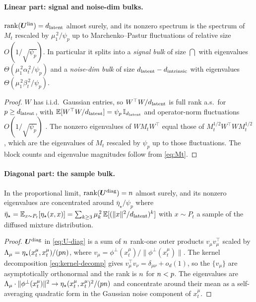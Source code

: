 \paragraph{Linear part: signal and noise-dim bulks.}
\begin{lemma}
\label{lem:Ulin}
$\mathrm{rank}(\bm{U}^{\mathrm{lin}}) = d_{\mathrm{latent}}$ almost surely, and its
nonzero spectrum is the spectrum of $M_t$ rescaled by
$\mu_1^{\,2}/\psi_p$ up to Marchenko--Pastur fluctuations of
relative size $O(1/\sqrt{\psi_p})$. In particular it splits into
a \emph{signal bulk} of size $\dint$ with eigenvalues
$\Theta(\mu_1^{\,2}\alpha_t^{\,2}/\psi_p)$ and a \emph{noise-dim bulk}
of size $d_{\mathrm{latent}} - d_{\mathrm{intrinsic}}$ with eigenvalues
$\Theta(\mu_1^{\,2}\beta_t^{\,2}/\psi_p)$.
\end{lemma}
\begin{proof}
$W$ has i.i.d.\ Gaussian entries, so $W^\top W/d_{\mathrm{latent}}$ is full rank a.s.\
for $p\ge d_{\mathrm{latent}}$, with $\mathbb{E}[W^\top W/d_{\mathrm{latent}}] = \psi_p\,\mathbb{I}_{d_{\mathrm{latent}}}$
and operator-norm fluctuations $O(1/\sqrt{\psi_p})$
\citep{pennington2017nonlinear}. The nonzero eigenvalues of
$WM_tW^\top$ equal those of $M_t^{1/2}W^\top W M_t^{1/2}$, which are
the eigenvalues of $M_t$ rescaled by $\psi_p$ up to those fluctuations.
The block counts and eigenvalue magnitudes follow from \eqref{eq:Mt}.
\end{proof}

\paragraph{Diagonal part: the sample bulk.}
\begin{lemma}
\label{lem:Udiag}
In the proportional limit,
$\mathrm{rank}(\bm{U}^{\mathrm{diag}}) = n$ almost surely, and its
nonzero eigenvalues are concentrated around
$\bar\eta_\star/\psi_p$ where
$\bar\eta_\star = \mathbb{E}_{x\sim P_t}[\eta_\star(x,x)]
 = \sum_{k\ge 3}\mu_k^{\,2}\,\mathbb{E}[(\|x\|^2/d_{\mathrm{latent}})^k]$
with $x \sim P_t$ a sample of the diffused mixture distribution.
\end{lemma}
\begin{proof}
$\bm{U}^{\mathrm{diag}}$ in \eqref{eq:U-diag} is a sum of $n$
rank-one outer products $v_\mu v_\mu^\top$ scaled by
$\Lambda_\mu = \eta_\star(x_t^\mu,x_t^\mu)/(pn)$,
where $v_\mu = \phi^\perp(x_t^\mu)/\|\phi^\perp(x_t^\mu)\|$.
The kernel decomposition \eqref{eq:kernel-decomp} gives
$v_\mu^\top v_\nu = \delta_{\mu\nu} + o_d(1)$, so the $\{v_\mu\}$
are asymptotically orthonormal and the rank is $n$ for
$n < p$. The eigenvalues are
$\Lambda_\mu \cdot \|\phi^\perp(x_t^\mu)\|^2 \to
\eta_\star(x_t^\mu,x_t^\mu)^2/(pn)$ and concentrate
around their mean as a self-averaging quadratic form in the
Gaussian noise component of $x_t^\mu$.
\end{proof}

